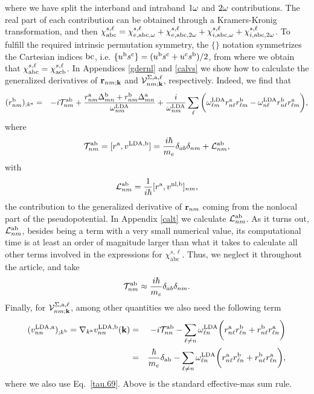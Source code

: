 \documentclass[floatfix,prb,aps,superscriptaddress,11pt,preprint]{revtex4}
\begin{document}
where we have split the interband and intraband $1\omega$ and $2\omega$
contributions. The real part of each contribution can be obtained through
a Kramers-Kronig transformation,\cite{nicolas} and then
$\chi^{s,\ell}_{\mathrm{a}\mathrm{b}\mathrm{c}}=\chi^{s,\ell}_{e,\mathrm{a}\mathrm{b}\mathrm{c},\omega}+\chi^{s,\ell}_{e,\mathrm{a}\mathrm{b}\mathrm{c},2\omega}+\chi^{s,\ell}_{i,\mathrm{a}\mathrm{b}\mathrm{c},\omega}+\chi^{s,\ell}_{i,\mathrm{a}\mathrm{b}\mathrm{c},2\omega}
$.
To 
fulfill the required intrinsic
permutation symmetry,\cite{rashkeevPRB98} 
the
$\{\}$ notation symmetrizes the Cartesian indices $\mathrm{b}\mathrm{c}$, i.e. 
$\{u^{\mathrm{b}}s^{\mathrm{c}}\}=(u^{\mathrm{b}}s^{\mathrm{c}}+u^{\mathrm{c}}s^{\mathrm{b}})/2$,
from where we obtain that
$\chi_{\mathrm{a}\mathrm{b}\mathrm{c}}^{s,\ell}=\chi_{\mathrm{a}\mathrm{c}\mathrm{b}}^{s,\ell}$.
In Appendices \ref{gdernl} and \ref{calvs} we show how to calculate  
the generalized derivatives of $\mathbf{r}_{nm;\mathbf{k}}$ and
${\mathbf{\cal V}}^{\Sigma,\mathrm{a},\ell}_{nm;\mathbf{k}}$, respectively. 
Indeed, we find that
\begin{eqnarray}\label{rgen.69}
(r^{\mathrm{b}}_{nm})_{;k^{\mathrm{a}}}
&=&
-i{\cal T}^{\mathrm{a}\mathrm{b}}_{nm}
+
\frac{
r^{\mathrm{a}}_{nm}
\Delta^{\mathrm{b}}_{mn}
+r^{\mathrm{b}}_{nm}
\Delta^{\mathrm{a}}_{mn}
}
{\omega^{\mathrm{LDA}}_{nm}}
+
\frac{i}{\omega^{\mathrm{LDA}}_{nm}}
\sum_{\ell}
\bigg(
\omega^{\mathrm{LDA}}_{\ell m}
r^{\mathrm{a}}_{n\ell}
r^{\mathrm{b}}_{\ell m}
-
\omega^{\mathrm{LDA}}_{n\ell}
r^{\mathrm{b}}_{n\ell}
r^{\mathrm{a}}_{\ell m}
\bigg)
,
\end{eqnarray}
where
\begin{eqnarray}\label{tau.1}
{\cal T}_{nm}^{\mathrm{a}\mathrm{b}}
=
[r^{\mathrm{a}},v^{\mathrm{LDA},\mathrm{b}}]= 
\frac{i\hbar}{m_e}\delta_{ab}\delta_{nm}+
{\cal L}_{nm}^{\mathrm{a}\mathrm{b}}
,
\end{eqnarray}  
with
\begin{eqnarray}\label{tau.2}
{\cal L}_{nm}^{\mathrm{a}\mathrm{b}}
=
\frac{1}{i\hbar}[r^{\mathrm{a}},v^{\mathrm{nl},\mathrm{b}}]_{nm}
,
\end{eqnarray}
the contribution to the generalized derivative of $\mathbf{r}_{nm}$
coming from the nonlocal part of the pseudopotential.
In Appendix \ref{calt} we calculate
${\cal L}^{\mathrm{a}\mathrm{b}}_{nm}$.  
As it turns out, ${\cal L}^{\mathrm{a}\mathrm{b}}_{nm}$, 
besides being a term with a very small numerical value, 
its computational time is at least an order of magnitude larger
 than what it takes to calculate all other terms involved in the expressions for 
$\chi^{s,\ell}_{\mathrm{abc}}$.\cite{valerie}
Thus, we neglect it throughout the article, and take
\begin{eqnarray}\label{tau.69}
{\cal T}_{nm}^{\mathrm{a}\mathrm{b}}
\approx
\frac{i\hbar}{m_e}\delta_{ab}\delta_{nm}
.
\end{eqnarray} 
Finally,
for ${\mathbf{\cal V}}^{\Sigma,\mathrm{a},\ell}_{nm;\mathbf{k}}$, among other quantities we also
need the following term
\begin{eqnarray}\label{a.3c}
(v^{\mathrm{LDA},\mathrm{a}}_{nn})_{;k^{\mathrm{b}}}
=
\nabla_{k^{\mathrm{a}}} 
v^{\mathrm{LDA},\mathrm{b}}_{nn}(\mathbf{k})
&=&
-i{\cal T}^{\mathrm{a}\mathrm{b}}_{nn}
-
\sum_{\ell\ne n}
\omega^{\mathrm{LDA}}_{\ell n}
\bigg( 
r^{\mathrm{a}}_{n\ell} 
r^{\mathrm{b}}_{\ell n}
+ 
r^{\mathrm{b}}_{n\ell} 
r^{\mathrm{a}}_{\ell n}
\bigg)
\nonumber\\
&=&
\frac{\hbar}{m_e}\delta_{\mathrm{a}\mathrm{b}}
-
\sum_{\ell\ne n}
\omega^{\mathrm{LDA}}_{\ell n}
\bigg( 
r^{\mathrm{a}}_{n\ell} 
r^{\mathrm{b}}_{\ell n}
+ 
r^{\mathrm{b}}_{n\ell} 
r^{\mathrm{a}}_{\ell n}
\bigg)
,
\end{eqnarray} 
where we also use Eq.~\eqref{tau.69}. Above
is the standard effective-mas sum rule.\cite{ashcroft_solid_1976} 
\end{document}
